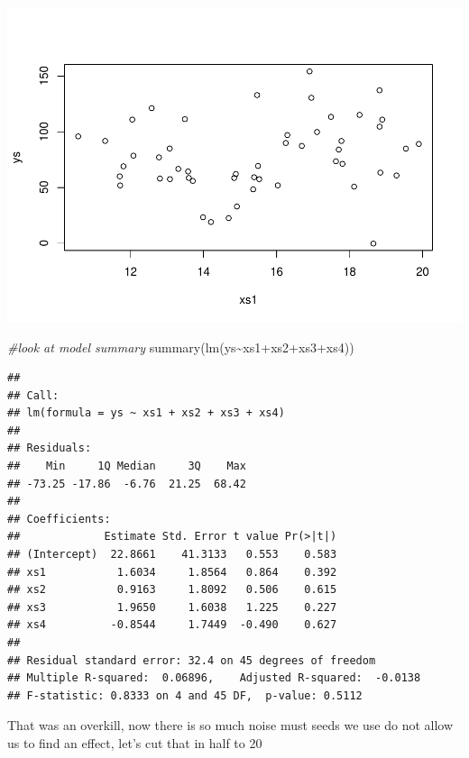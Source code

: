 \documentclass[
]{book}
\newenvironment{Shaded}{\begin{snugshade}}{\end{snugshade}}
\newcommand{\CommentTok}[1]{\textcolor[rgb]{0.56,0.35,0.01}{\textit{#1}}}
\newcommand{\FunctionTok}[1]{\textcolor[rgb]{0.00,0.00,0.00}{#1}}
\newcommand{\NormalTok}[1]{#1}
\newcommand{\SpecialCharTok}[1]{\textcolor[rgb]{0.00,0.00,0.00}{#1}}
\begin{document}
\includegraphics{ECOMODbook_files/figure-latex/a7.5-1.pdf}

\begin{Shaded}
\begin{Highlighting}[]
\CommentTok{\#look at model summary}
\FunctionTok{summary}\NormalTok{(}\FunctionTok{lm}\NormalTok{(ys}\SpecialCharTok{\textasciitilde{}}\NormalTok{xs1}\SpecialCharTok{+}\NormalTok{xs2}\SpecialCharTok{+}\NormalTok{xs3}\SpecialCharTok{+}\NormalTok{xs4))}
\end{Highlighting}
\end{Shaded}

\begin{verbatim}
## 
## Call:
## lm(formula = ys ~ xs1 + xs2 + xs3 + xs4)
## 
## Residuals:
##    Min     1Q Median     3Q    Max 
## -73.25 -17.86  -6.76  21.25  68.42 
## 
## Coefficients:
##             Estimate Std. Error t value Pr(>|t|)
## (Intercept)  22.8661    41.3133   0.553    0.583
## xs1           1.6034     1.8564   0.864    0.392
## xs2           0.9163     1.8092   0.506    0.615
## xs3           1.9650     1.6038   1.225    0.227
## xs4          -0.8544     1.7449  -0.490    0.627
## 
## Residual standard error: 32.4 on 45 degrees of freedom
## Multiple R-squared:  0.06896,    Adjusted R-squared:  -0.0138 
## F-statistic: 0.8333 on 4 and 45 DF,  p-value: 0.5112
\end{verbatim}

That was an overkill, now there is so much noise must seeds we use do not allow us to find an effect, let's cut that in half to 20
\end{document}
